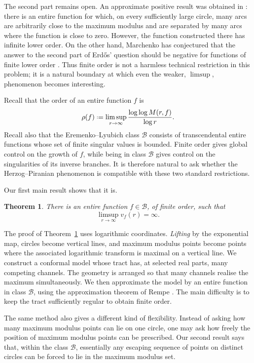 \documentclass[a4paper, 11pt, reqno]{amsart}
\numberwithin{equation}{section}
\theoremstyle{plain}
\newtheorem{theorem}{Theorem}[section]
\newcommand*{\defeq}{\mathrel{\vcenter{\baselineskip0.5ex \lineskiplimit0pt
 \hbox{\scriptsize.}\hbox{\scriptsize.}}}=}
\theoremstyle{remark}
\newcommand{\B}{{\mathcal{B}}}
\begin{document}
The second part remains open. An approximate positive result was obtained in \cite{leti_Adi_Erdos}: there is an entire function for which, on every sufficiently large circle, many arcs are arbitrarily close to the maximum modulus and are separated by many arcs where the function is close to zero. However, the function constructed there has infinite lower order. On the other hand, Marchenko has conjectured that the answer to the second part of Erd\H{o}s' question should be negative for functions of finite lower order \cite{Marchenko2012}. Thus finite order is not a harmless technical restriction in this problem; it is a natural boundary at which even the weaker, \(\limsup\), phenomenon becomes interesting.

Recall that the order of an entire function \(f\) is
\[
\rho(f)\defeq \limsup_{r\to\infty}\frac{\log\log M(r,f)}{\log r}.
\]
Recall also that the Eremenko--Lyubich class \(\B\) consists of transcendental entire functions whose set of finite singular values is bounded. Finite order gives global control on the growth of \(f\), while being in class \(\B\) gives control on the singularities of its inverse branches. It is therefore natural to ask whether the Herzog--Piranian phenomenon is compatible with these two standard restrictions.

Our first main result shows that it is.

\begin{theorem}
	\label{th:1}
	There is an entire function \(f\in\B\), of finite order, such that
	\[
	\limsup_{r\to\infty} v_f(r)=\infty.
	\]
\end{theorem}

The proof of Theorem~\ref{th:1} uses logarithmic coordinates. \textit{Lifting} by the exponential map, circles become vertical lines, and maximum modulus points become points where the associated logarithmic transform is maximal on a vertical line. We construct a conformal model whose tract has, at selected real parts, many competing channels. The geometry is arranged so that many channels realise the maximum simultaneously. We then approximate the model by an entire function in class \(\B\), using the approximation theorem of Rempe \cite{lasse_model14}. The main difficulty is to keep the tract sufficiently regular to obtain finite order.

The same method also gives a different kind of flexibility. Instead of asking how many maximum modulus points can lie on one circle, one may ask how freely the position of maximum modulus points can be prescribed. Our second result says that, within the class \(\B\), essentially any escaping sequence of points on distinct circles can be forced to lie in the maximum modulus set.
\end{document}
